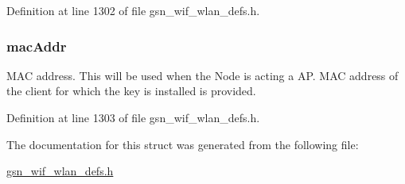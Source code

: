 Definition at line 1302 of file gsn\_\-wif\_\-wlan\_\-defs.h.

\hypertarget{a00386_ab623c15c7dc79be51bcdaa04fba67d90}{
\subsubsection[{macAddr}]{ {\bf macAddr}}}
\label{a00386_ab623c15c7dc79be51bcdaa04fba67d90}
MAC address. This will be used when the Node is acting a AP. MAC address of the client for which the key is installed is provided. 

Definition at line 1303 of file gsn\_\-wif\_\-wlan\_\-defs.h.



The documentation for this struct was generated from the following file:\begin{DoxyCompactItemize}
\item 
\hyperlink{a00613}{gsn\_\-wif\_\-wlan\_\-defs.h}\end{DoxyCompactItemize}
